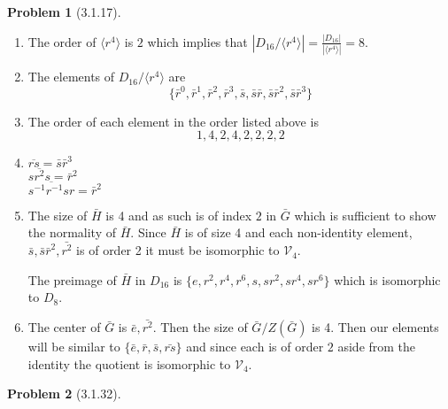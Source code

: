 \documentclass[10pt]{article}
\newcommand{\sk}{\vskip 10mm}
\theoremstyle{plain}
\newtheorem{problem}{Problem}
\theoremstyle{remark}
\begin{document}
\sk

\begin{problem}[3.1.17] %
  
\end{problem}

\begin{enumerate}
\item The order of $\langle r^4\rangle$ is $2$ which implies that
  $|D_{16}/\langle r^4\rangle|=\frac{|D_{16}|}{|\langle r^4\rangle|}=8$.
\item The elements of $D_{16}/\langle r^4\rangle$ are
  \[\{\bar{r}^0,\bar{r}^1,\bar{r}^2,\bar{r}^3,\bar{s},\bar{s}\bar{r},\bar{s}\bar{r}^2,\bar{s}\bar{r}^3\}\]
\item The order of each element in the order listed above is
  \[ 1,4,2,4,2,2,2,2\]
\item $\overline{rs}=\bar{s}\bar{r}^3$\\
  $\overline{sr^2s}=\bar{r}^2$\\
  $\overline{s^{-1}r^{-1}sr}=\bar{r}^2$
\item The size of $\bar{H}$ is 4 and as such is of index $2$ in $\bar{G}$ which
  is sufficient to show the normality of $\bar{H}$. Since $\bar{H}$ is of size
  4 and each non-identity element, $\bar{s},\bar{s}\bar{r}^2,\bar{r^2}$ is of order
  2 it must be isomorphic to $\mathcal{V}_4$.

  The preimage of $\bar{H}$ in $D_{16}$ is $\{e,r^2,r^4,r^6,s,sr^2,sr^4,sr^6\}$ which is
  isomorphic to $D_8$.
\item The center of $\bar{G}$ is $\bar{e},\bar{r^2}$. Then
  the size of $\bar{G}/Z(\bar{G})$ is 4. Then our elements will be similar to
  $\{\bar{e},\bar{r},\bar{s},\bar{rs}\}$ and since each is of order $2$ aside from the
  identity the quotient is isomorphic to $\mathcal{V}_4$.
\end{enumerate}

\sk

\begin{problem}[3.1.32] %
  
\end{problem}
\end{document}
